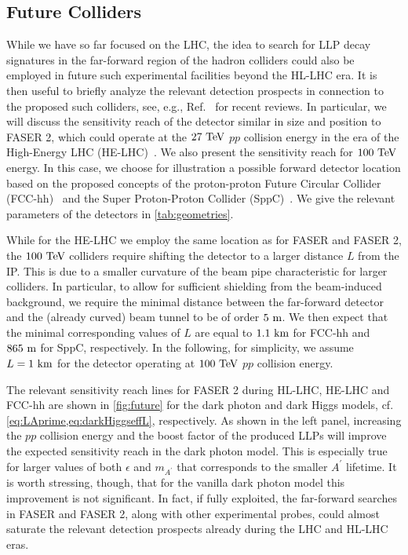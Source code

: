 \documentclass[prd,twocolumn,reprint,preprintnumbers,nofootinbib]{revtex4-1}
\begin{document}
\subsection{Future Colliders}
\label{sec:future} 

While we have so far focused on the LHC, the idea to search for LLP decay signatures in the far-forward region of the hadron colliders could also be employed in future such experimental facilities beyond the HL-LHC era. It is then useful to briefly analyze the relevant detection prospects in connection to the proposed such colliders, see, e.g.,  Ref.~\cite{Benedikt:2018ofy,Zimmermann:2018koi} for recent reviews. In particular, we will discuss the sensitivity reach of the detector similar in size and position to FASER 2, which could operate at the $27~\text{TeV}$ $pp$ collision energy in the era of the High-Energy LHC (HE-LHC)~\cite{Todesco:2011np}. We also present the sensitivity reach for $100~\text{TeV}$ energy. In this case, we choose for illustration a possible forward detector location based on the proposed concepts of the proton-proton Future Circular Collider (FCC-hh)~\cite{Mangano:2017tke} and the Super Proton-Proton Collider (SppC)~\cite{Gao:2017ssn}. We give the relevant parameters of the detectors in \cref{tab:geometries}.

While for the HE-LHC we employ the same location as for FASER and FASER 2, the $100~\text{TeV}$ colliders require shifting the detector to a larger distance $L$ from the IP. This is due to a smaller curvature of the beam pipe characteristic for larger colliders. In particular, to allow for sufficient shielding from the beam-induced background, we require the minimal distance between the far-forward detector and the (already curved) beam tunnel to be of order $5~\text{m}$. We then expect that the minimal corresponding values of $L$ are equal to $1.1~\text{km}$ for FCC-hh and $865~\text{m}$ for SppC, respectively. In the following, for simplicity, we assume $L=1~\text{km}$ for the detector operating at $100~\text{TeV}$ $pp$ collision energy. 

The relevant sensitivity reach lines for FASER 2 during HL-LHC, HE-LHC and FCC-hh are shown in \cref{fig:future} for the dark photon and dark Higgs models, cf. \cref{eq:LAprime,eq:darkHiggseffL}, respectively. As shown in the left panel, increasing the $pp$ collision energy and the boost factor of the produced LLPs will improve the expected sensitivity reach in the dark photon model. This is especially true for larger values of both $\epsilon$ and $m_{A^\prime}$ that corresponds to the smaller $A^\prime$ lifetime. It is worth stressing, though, that for the vanilla dark photon model this improvement is not significant. In fact, if fully exploited, the far-forward searches in FASER and FASER 2, along with other experimental probes, could almost saturate the relevant detection prospects already during the LHC and HL-LHC eras.
\end{document}
